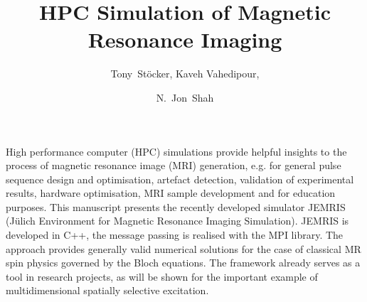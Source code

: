 \documentclass{nic-series}
\begin{document}
 

\title{HPC Simulation of Magnetic Resonance Imaging}

\author{Tony~St\"ocker, Kaveh Vahedipour, \and N.~Jon~Shah }


\maketitle

\begin{abstracts}
High performance computer (HPC) simulations provide helpful insights to the process of magnetic resonance
image (MRI) generation, e.g. for general pulse sequence design and optimisation, artefact detection, validation of
experimental results, hardware optimisation, MRI sample development and for education purposes. This manuscript presents
the recently developed simulator JEMRIS (Jülich Environment for Magnetic Resonance Imaging Simulation). JEMRIS is
developed in C++, the message passing is realised with the MPI library. The approach provides generally valid numerical
solutions for the case of classical MR spin physics governed by the Bloch equations. The framework already serves as a tool
in research projects, as will be shown for the important example of multidimensional spatially selective excitation.
\end{abstracts}

\end{document}
